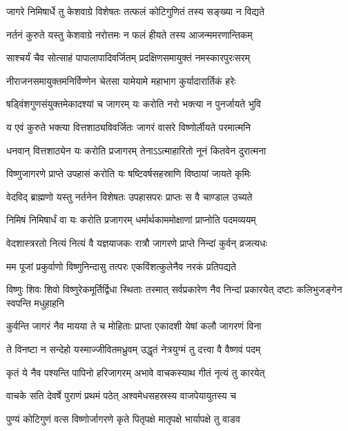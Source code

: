 \twolineshloka
{जागरे निमिषार्धे तु केशवाग्रे विशेषतः}
{तत्फलं कोटिगुणितं तस्य सङ्ख्या न विद्यते}%

\twolineshloka
{नर्तनं कुरुते यस्तु केशवाग्रे नरोत्तमः}
{न फलं हीयते तस्य आजन्ममरणान्तिकम्}%

\twolineshloka
{साश्चर्यं चैव सोत्साहं पापालापादिवर्जितम्}
{प्रदक्षिणसमायुक्तं नमस्कारपुरःसरम्}%

\twolineshloka
{नीराजनसमायुक्तमनिर्विण्णेन चेतसा}
{यामेयामे महाभाग कुर्यादारार्तिकं हरेः}%

\twolineshloka
{षड्विंशगुणसंयुक्तमेकादश्यां च जागरम्}
{यः करोति नरो भक्त्या न पुनर्जायते भुवि}%

\twolineshloka
{य एवं कुरुते भक्त्या वित्तशाठ्यविवर्जितः}
{जागरं वासरे विष्णोर्लीयते परमात्मनि}%

\twolineshloka
{धनवान् वित्तशाठ्येन यः करोति प्रजागरम्}
{तेनाऽऽत्माहारितो नूनं कितवेन दुरात्मना}%

\twolineshloka
{विष्णुजागरणे प्राप्ते उपहासं करोति यः}
{षष्टिवर्षसहस्राणि विष्ठायां जायते कृमिः}%

\twolineshloka
{वेदविद् ब्राह्मणो यस्तु नर्तनेन विशेषतः}
{उपहासपरः प्राप्तः स वै चाण्डाल उच्यते}%

\twolineshloka
{निमिषं निमिषार्धं वा यः करोति प्रजागरम्}
{धर्मार्थकाममोक्षाणां प्राप्नोति पदमव्ययम्}%

\twolineshloka
{वेदशास्त्ररतो नित्यं नित्यं वै यज्ञयाजकः}
{रात्रौ जागरणे प्राप्ते निन्दां कुर्वन् व्रजत्यधः}%

\twolineshloka
{मम पूजां प्रकुर्वाणो विष्णुनिन्दासु तत्परः}
{एकविंशत्कुलेनैव नरकं प्रतिपद्यते}%

\threelineshloka
{विष्णुः शिवः शिवो विष्णुरेकमूर्तिर्द्विधा स्थिताः}
{तस्मात् सर्वप्रकारेण नैव निन्दां प्रकारयेत्}
{दष्टाः कलिभुजङ्गेन स्वपन्ति मधुहाहनि}%

\twolineshloka
{कुर्वन्ति जागरं नैव मायया ते च मोहिताः}
{प्राप्ता एकादशी येषां कलौ जागरणं विना}%

\twolineshloka
{ते विनष्टा न सन्देहो यस्माज्जीवितमध्रुवम्}
{उद्धृतं नेत्रयुग्मं तु दत्त्वा वै वैष्णवं पदम्}%

\twolineshloka
{कृतं ये नैव पश्यन्ति पापिनो हरिजागरम्}
{अभावे वाचकस्याथ गीतं नृत्यं तु कारयेत्}%

\twolineshloka
{वाचके सति देवर्षे पुराणं प्रथमं पठेत्}
{अश्वमेधसहस्रस्य वाजपेयायुतस्य च}%

\twolineshloka
{पुण्यं कोटिगुणं वत्स विष्णोर्जागरणे कृते}
{पितृपक्षे मातृपक्षे भार्यापक्षे तु वाडव}%

